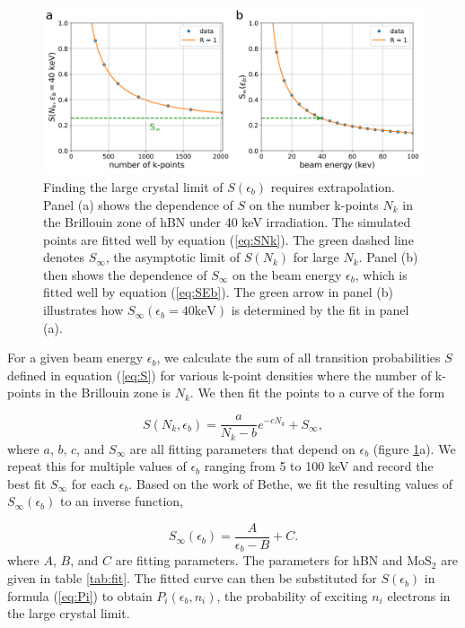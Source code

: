 \documentclass{article}
\begin{document}
\begin{figure}[H]
  \centering
  \includegraphics[width=\textwidth]{figS3.pdf}
  \caption{
    Finding the large crystal limit of $S(\epsilon_b)$ requires extrapolation.
    Panel (a) shows the dependence of $S$ on the number k-points $N_k$ in the
    Brillouin zone of hBN under 40 keV irradiation.
    The simulated points are fitted well by equation (\ref{eq:SNk}).
    The green dashed line denotes $S_\infty$, the asymptotic limit of $S(N_k)$
    for large $N_k$.
    Panel (b) then shows the dependence of $S_\infty$ on the beam energy
    $\epsilon_b$, which is fitted well by equation (\ref{eq:SEb}).
    The green arrow in panel (b) illustrates how $S_\infty(\epsilon_b=40\text{
    keV})$ is determined by the fit in panel (a).
  }
  \label{fig:Sfit}
\end{figure}

For a given beam energy $\epsilon_b$, we calculate the sum of all transition
probabilities $S$ defined in equation (\ref{eq:S}) for various k-point
densities where the number of k-points in the Brillouin zone is $N_k$.
We then fit the points to a curve of the form

\begin{equation}
  S(N_k, \epsilon_b)
  =
  \frac{a}{N_k-b}e^{-cN_k} + S_\infty,
  \label{eq:SNk}
\end{equation}
%
where $a$, $b$, $c$, and $S_\infty$ are all fitting parameters that depend on
$\epsilon_b$ (figure \ref{fig:Sfit}a).
We repeat this for multiple values of $\epsilon_b$ ranging from 5 to 100 keV
and record the best fit
$S_\infty$ for each
$\epsilon_b$.
Based on the work of Bethe,\cite{Bethe1930, Susi2019, Kretschmer2020} we fit the resulting values of
$S_\infty(\epsilon_b)$ to an inverse function,

\begin{equation}
  S_\infty(\epsilon_b)
  =
  \frac{A}{\epsilon_b - B} + C.
  \label{eq:SEb}
\end{equation}
%
where $A$, $B$, and $C$ are fitting parameters.  The parameters for hBN and
MoS$_2$ are given in table \ref{tab:fit}.
The fitted curve can then be substituted for $S(\epsilon_b)$ in formula
(\ref{eq:Pi}) to obtain $P_i(\epsilon_b, n_i)$, the probability of exciting
$n_i$ electrons in the large crystal limit.
\end{document}
